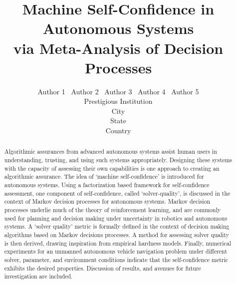 \documentclass[10pt]{article}
\title{Machine Self-Confidence in Autonomous Systems \\ via  Meta-Analysis of Decision Processes}%
\author{Author 1 \ Author 2 \ Author 3 \ Author 4 \ Author 5\\ 
        Prestigious Institution\\
        City\\
        State\\
        Country
    }\\
\begin{document}
\maketitle
\begin{abstract}
    Algorithmic assurances from advanced autonomous systems assist human users in understanding, trusting, and using such systems appropriately. Designing these systems with the capacity of assessing their own capabilities is one approach to creating an algorithmic assurance. The idea of `machine self-confidence' is introduced for autonomous systems. Using a factorization based framework for self-confidence assessment, one component of self-confidence, called `solver-quality', is discussed in the context of Markov decision processes for autonomous systems. Markov decision processes underlie much of the theory of reinforcement learning, and are commonly used for planning and decision making under uncertainty in robotics and autonomous systems. A `solver quality' metric is formally defined in the context of decision making algorithms based on Markov decisions processes. A method for assessing solver quality  is then derived, drawing inspiration from empirical hardness models. Finally, numerical experiments for an unmanned autonomous vehicle navigation problem under different solver, parameter, and environment conditions indicate that the self-confidence metric exhibits the desired properties. Discussion of results, and avenues for future investigation are included.
\end{abstract}








\end{document}

